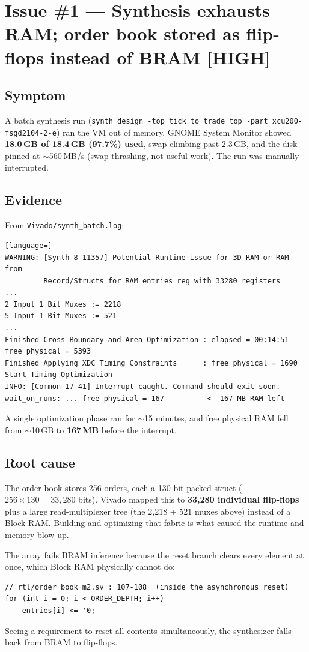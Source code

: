 \documentclass[11pt,a4paper]{article}
\newcommand{\sev}[1]{%
  \ifstrequal{#1}{HIGH}{\textcolor{sev-high}{\textbf{[HIGH]}}}{%
  \ifstrequal{#1}{MED}{\textcolor{sev-med}{\textbf{[MEDIUM]}}}{%
  \textcolor{sev-low}{\textbf{[LOW]}}}}}
\begin{document}
\section{Issue \#1 — Synthesis exhausts RAM; order book stored as flip-flops instead of BRAM \sev{HIGH}}

\subsection{Symptom}
A batch synthesis run (\texttt{synth\_design -top tick\_to\_trade\_top -part
xcu200-fsgd2104-2-e}) ran the VM out of memory. GNOME System Monitor showed
\textbf{18.0\,GB of 18.4\,GB (97.7\%) used}, swap climbing past 2.3\,GB, and the
disk pinned at $\sim$560\,MB/s (swap thrashing, not useful work). The run was
manually interrupted.

\subsection{Evidence}
From \texttt{Vivado/synth\_batch.log}:
\begin{lstlisting}[language=]
WARNING: [Synth 8-11357] Potential Runtime issue for 3D-RAM or RAM from
         Record/Structs for RAM entries_reg with 33280 registers
...
2 Input 1 Bit Muxes := 2218
5 Input 1 Bit Muxes := 521
...
Finished Cross Boundary and Area Optimization : elapsed = 00:14:51  free physical = 5393
Finished Applying XDC Timing Constraints      : free physical = 1690
Start Timing Optimization
INFO: [Common 17-41] Interrupt caught. Command should exit soon.
wait_on_runs: ... free physical = 167          <- 167 MB RAM left
\end{lstlisting}
A single optimization phase ran for $\sim$15 minutes, and free physical RAM fell
from $\sim$10\,GB to \textbf{167\,MB} before the interrupt.

\subsection{Root cause}
The order book stores 256 orders, each a 130-bit packed struct
($256 \times 130 = 33{,}280$ bits). Vivado mapped this to \textbf{33,280
individual flip-flops} plus a large read-multiplexer tree (the 2{,}218 + 521
muxes above) instead of a Block RAM. Building and optimizing that fabric is what
caused the runtime and memory blow-up.

The array fails BRAM inference because the reset branch clears every element at
once, which Block RAM physically cannot do:
\begin{lstlisting}
// rtl/order_book_m2.sv : 107-108  (inside the asynchronous reset)
for (int i = 0; i < ORDER_DEPTH; i++)
    entries[i] <= '0;
\end{lstlisting}
Seeing a requirement to reset all contents simultaneously, the synthesizer
falls back from BRAM to flip-flops.
\end{document}
